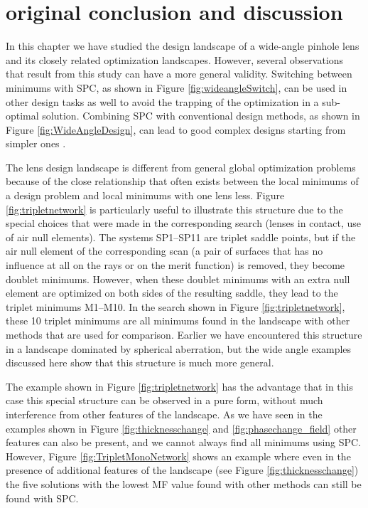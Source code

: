 
\section{original conclusion and discussion}
In this chapter we have studied the design landscape of a wide-angle pinhole lens and its closely related optimization landscapes. However, several observations that result from this study can have a more general validity. Switching between minimums with SPC, as shown in Figure \ref{fig:wideangleSwitch}, can be used in other design tasks as well to avoid the trapping of the optimization in a sub-optimal solution. Combining SPC with conventional design methods, as shown in Figure \ref{fig:WideAngleDesign}, can lead to good complex designs starting from simpler ones \cite{LivshitsSP2014}.

The lens design landscape is different from general global optimization problems because of the close relationship that often exists between the local minimums of a design problem and local minimums with one lens less. Figure \ref{fig:tripletnetwork} is particularly useful to illustrate this structure due to the special choices that were made in the corresponding search (lenses in contact, use of air null elements). The systems SP1–SP11 are triplet saddle points, but if the air null element of the corresponding scan (a pair of surfaces that has no influence at all on the rays or on the merit function) is removed, they become doublet minimums. However, when these doublet minimums with an extra null element are optimized on both sides of the resulting saddle, they lead to the triplet minimums M1–M10. In the search shown in Figure \ref{fig:tripletnetwork}, these 10 triplet minimums are all minimums found in the landscape with other methods that are used for comparison. Earlier we have encountered this structure in a landscape dominated by spherical aberration, but the wide angle examples discussed here show that this structure is much more general.

The example shown in Figure \ref{fig:tripletnetwork} has the advantage that in this case this special structure can be observed in a pure form, without much interference from other features of the landscape. As we have seen in the examples shown in Figure \ref{fig:thicknesschange} and \ref{fig:phasechange_field} other features can also be present, and we cannot always find all minimums using SPC. However, Figure \ref{fig:TripletMonoNetwork} shows an example where even in the presence of additional features of the landscape (see Figure \ref{fig:thicknesschange}) the five solutions with the lowest MF value found with other methods can still be found with SPC.

